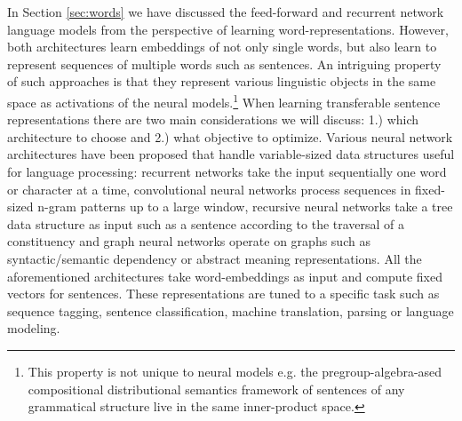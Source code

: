 In Section \ref{sec:words} we have discussed the feed-forward \citep{bengio2003neural}
and recurrent network \citep{mikolov2010recurrent} language models from the perspective
of learning word-representations. However, both architectures learn embeddings of not only single words,
but also learn to represent sequences of multiple words such as sentences.
An intriguing property of such approaches is that
they represent various linguistic objects in the same space as activations of the neural models.\footnote{This property is not unique to neural models e.g. the pregroup-algebra-ased compositional distributional
semantics framework of \cite{coecke2010mathematical}
sentences of any grammatical structure live in the same inner-product space.}
When learning transferable
sentence representations there are two main considerations we will discuss:
1.) which architecture to choose and 2.) what objective to optimize.
Various neural network architectures have been proposed that
handle variable-sized data structures useful for language processing: recurrent networks
take the input sequentially one word or character at a time,
convolutional neural networks
\citep{kalchbrenner2014convolutional,zhang2015character,conneau2016very,chen2014learning}
process sequences in fixed-sized n-gram patterns up to a large window,
recursive neural networks \citep{goller1996learning,socher2011parsing,kai2015treelstm}
take a tree data structure as input such as a sentence according to the traversal of a
constituency and graph neural networks operate on graphs \citep{marcheggiani2017encoding} such as
syntactic/semantic dependency or abstract meaning representations.
All the aforementioned architectures take word-embeddings as input
and compute fixed vectors for sentences.
These representations are tuned to a specific task such as sequence tagging,
sentence classification, machine translation, parsing or language modeling.


